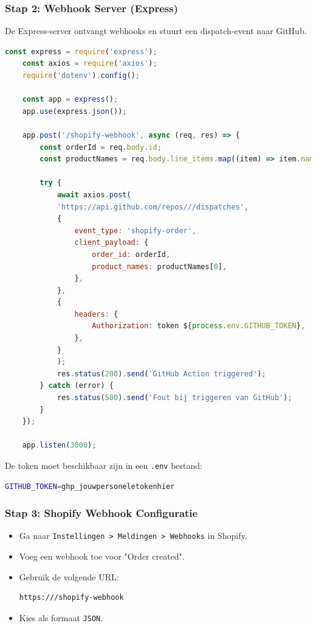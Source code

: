 \begin{enumerate}
\subsubsection{Stap 2: Webhook Server (Express)}

De Express-server ontvangt webhooks en stuurt een dispatch-event naar GitHub.

\begin{lstlisting}[language=javascript, caption=Webhook-server (gedeeltelijk weergegeven)]
    const express = require('express');
    const axios = require('axios');
    require('dotenv').config();
    
    const app = express();
    app.use(express.json());
    
    app.post('/shopify-webhook', async (req, res) => {
        const orderId = req.body.id;
        const productNames = req.body.line_items.map((item) => item.name);
        
        try {
            await axios.post(
            'https://api.github.com/repos///dispatches',
            {
                event_type: 'shopify-order',
                client_payload: {
                    order_id: orderId,
                    product_names: productNames[0],
                },
            },
            {
                headers: {
                    Authorization: token ${process.env.GITHUB_TOKEN},
                },
            }
            );
            res.status(200).send('GitHub Action triggered');
        } catch (error) {
            res.status(500).send('Fout bij triggeren van GitHub');
        }
    });
    
    app.listen(3000);
\end{lstlisting}

De token moet beschikbaar zijn in een \texttt{.env} bestand:

\begin{lstlisting}[language=bash, caption=.env bestand voorbeeld]
    GITHUB_TOKEN=ghp_jouwpersoneletokenhier
\end{lstlisting}

\subsubsection{Stap 3: Shopify Webhook Configuratie}

\begin{itemize}
    \item Ga naar \texttt{Instellingen > Meldingen > Webhooks} in Shopify.
    \item Voeg een webhook toe voor "Order created".
    \item Gebruik de volgende URL:
    \begin{lstlisting}[language=text]
        https:///shopify-webhook
    \end{lstlisting}
    \item Kies als formaat \texttt{JSON}.
\end{itemize}


\end{enumerate}
